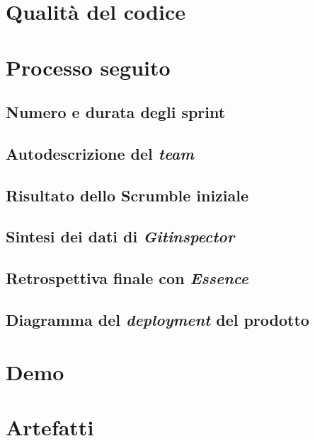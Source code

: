 \documentclass{article}
\begin{document}
\section{Qualità del codice}

\section{Processo seguito}

\subsection{Numero e durata degli sprint}

\subsection{Autodescrizione del \emph{team}}

\subsection{Risultato dello Scrumble iniziale}

\subsection{Sintesi dei dati di \emph{Gitinspector}}

\subsection{Retrospettiva finale con \emph{Essence}}

\subsection{Diagramma del \emph{deployment} del prodotto}

\section{Demo}

\section{Artefatti}
\end{document}
